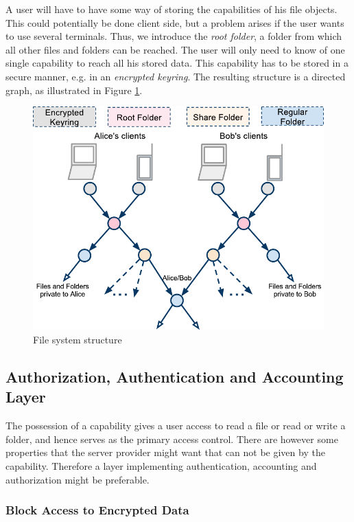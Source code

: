 \documentclass[pdftex,english,10pt,b5paper,twoside]{book}
\begin{document}
A user will have to have some way of storing the capabilities of his file
objects. This could potentially be done client side, but a problem arises if
the user wants to use several terminals. Thus, we introduce the \emph{root
folder}, a folder from which all other files and folders can be reached. The
user will only need to know of one single capability to reach all his stored
data. This capability has to be stored in a secure manner, e.g. in an
\emph{encrypted keyring}. The resulting structure is a directed graph, as
illustrated in Figure \ref{fig:AS:filesystem}.

\begin{figure}[h!]
    \centering
    \includegraphics[width=\columnwidth]{ArchitectureFileSystem.pdf}
    \caption{File system structure}
    \label{fig:AS:filesystem}
\end{figure}

\subsection{Authorization, Authentication and Accounting Layer}

The possession of a capability gives a user access to read a file or read or
write a folder, and hence serves as the primary access control. There are
however some properties that the server provider might want that can not be
given by the capability. Therefore a layer implementing authentication,
accounting and authorization might be preferable.

\subsubsection{Block Access to Encrypted Data}
\end{document}
